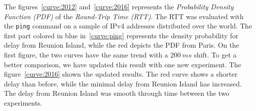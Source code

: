 \documentclass[10pt, conference, a4paper, twocolumns]{IEEEtran}
\def\yassine#1{\textbf{\textcolor{blue}{yassine : #1}}}
\begin{document}
The figures~\ref{curve:2012} and~\ref{curve:2016} represents the \emph{Probability Density Function (PDF)} of the \emph{Round-Trip Time (RTT)}. The RTT was evaluated with the \texttt{ping} command on a sample of IPv4 addresses distributed over the world. The first part colored in blue in~\ref{curve:ping} represents the density probability for delay from Reunion Island, while the red depicts the PDF from Paris. On the first figure, the two curves have the same trend with a $200\ ms$ shift.
To get a better comparison, we have updated this result with one new experiment. The figure~\ref{curve:2016} shown the updated results. The red curve shows a shorter delay than before, while the minimal delay from Reunion Island has increased. The delay from Reunion Island was smooth through time between the two experiments. 

\end{document}
